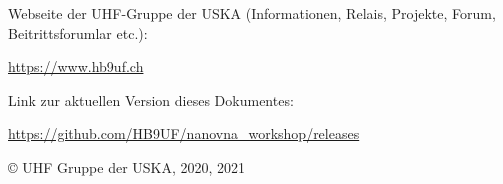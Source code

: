 \documentclass[twoside,a4paper,11pt,halfparskip,DIV=11,notitlepage]{scrartcl}
\begin{document}
\begin{titlepage}
\vfill
{}
\vfill
\clearpage
\vspace*{\fill}
\parbox{0.6\textwidth}{\scriptsize Webseite der UHF-Gruppe der USKA (Informationen, Relais, Projekte, Forum, Beitrittsforumlar etc.):\par
\url{https://www.hb9uf.ch}
}

\vspace{1cm}

\parbox{0.6\textwidth}{\scriptsize Link zur aktuellen Version dieses Dokumentes:\par
\url{https://github.com/HB9UF/nanovna_workshop/releases}
}

\vspace{1cm}

\scriptsize © UHF Gruppe der USKA, 2020, 2021
\end{titlepage}





\cleardoublepage

\maketitle

\setcounter{tocdepth}{1}
\tableofcontents



\newpage

\end{document}
